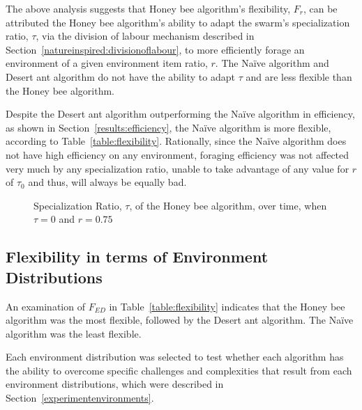 The above analysis suggests that Honey bee algorithm's flexibility, $F_r$, can be attributed the Honey bee algorithm's ability to adapt the swarm's specialization ratio, $\tau$, via the division of labour mechanism described in Section~\ref{natureinspired:divisionoflabour}, to more efficiently forage an environment of a given environment item ratio, $r$. The Na\"ive algorithm and Desert ant algorithm do not have the ability to adapt $\tau$ and are less flexible than the Honey bee algorithm.

Despite the Desert ant algorithm outperforming the Na\"ive algorithm in efficiency, as shown in Section~\ref{results:efficiency}, the Na\"ive algorithm is more flexible, according to Table~\ref{table:flexibility}. Rationally, since the Na\"ive algorithm does not have high efficiency on any environment, foraging efficiency was not affected very much by any specialization ratio, unable to take advantage of any value for $r$ of $\tau_0$ and thus, will always be equally bad.


\begin{figure}[!htb]
\centering
\resizebox{\textwidth}{!}{}
\caption{Specialization Ratio, $\tau$, of the Honey bee algorithm, over time, when $\tau=0$ and $r=0.75$}
\label{fig:specializationratioovertime}
\end{figure}


\subsection{Flexibility in terms of Environment Distributions}
\label{results:flexibility:environmentdistribution}

An examination of $F_{ED}$ in Table~\ref{table:flexibility} indicates that the Honey bee algorithm was the most flexible, followed by the Desert ant algorithm. The Na\"ive algorithm was the least flexible.

Each environment distribution was selected to test whether each algorithm has the ability to overcome specific challenges and complexities that result from each environment distributions, which were described in Section~\ref{experimentenvironments}.

